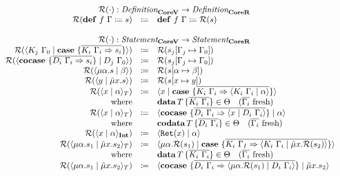 \[
  \begin{array}{rcll}
    \multicolumn{4}{c}{\redundancy{\cdot} : \emph{Definition}_{\targetvar{}} \rightarrow \emph{Definition}_{\targetred{}}}\\
    \redundancy{\defi{f\ \Gamma}{s}} & \coloneq & \defi{f\ \Gamma}{\redundancy{s}} & \\
    \\
    \multicolumn{4}{c}{\redundancy{\cdot} : \emph{Statement}_{\targetvar{}} \rightarrow \emph{Statement}_{\targetred{}}}\\
    \redundancy{\cut{K_j\ \Gamma_0}{\case{\overline{K_i\ \Gamma_i \Rightarrow s_i}}}} & \coloneq & \redundancy{s_j[\Gamma_j \mapsto \Gamma_0]} & \\
    \redundancy{\cut{\cocase{\overline{D_i\ \Gamma_i \Rightarrow s_i}}}{D_j\ \Gamma_0}} & \coloneq & \redundancy{s_j[\Gamma_j \mapsto \Gamma_0]} & \\
    \redundancy{\cut{\mu\alpha.s}{\beta}} & \coloneq & \redundancy{s[\alpha \mapsto \beta]} & \\
    \redundancy{\cut{y}{\tilde{\mu}x.s}} & \coloneq & \redundancy{s[x \mapsto y]} & \\
    \redundancy{\cut{x}{\alpha}_T} & \coloneq & \cut{x}{\case{\overline{K_i\ \Gamma_i \Rightarrow \cut{K_i\ \Gamma_i}{\alpha}}}} & \\
    \text{where} &  & \data{T}{\overline{K_i\ \Gamma_i}} \in \Theta \quad \fresh{\overline{\Gamma_i}} & \\
    \redundancy{\cut{x}{\alpha}_T} & \coloneq & \cut{\cocase{\overline{D_i\ \Gamma_i \Rightarrow \cut{x}{D_i\ \Gamma_i}}}}{\alpha} & \\
    \text{where} &  & \codata{T}{\overline{D_i\ \Gamma_i}} \in \Theta \quad \fresh{\overline{\Gamma_i}} & \\
    \redundancy{\cut{x}{\alpha}_\tyint} & \coloneq & \cut{\mathtt{Ret}(x)}{\alpha} & \\
    \redundancy{\cut{\mu\alpha.s_1}{\tilde{\mu}x.s_2}_T} & \coloneq & \cut{\mu\alpha.\redundancy{s_1}}{\case{\overline{K_i\ \Gamma_I \Rightarrow \cut{K_i\ \Gamma_i}{\tilde{\mu}x.\redundancy{s_2}}}}} & \\
    \text{where} &  & \data{T}{\overline{K_i\ \Gamma_i}} \in \Theta \quad \fresh{\overline{\Gamma_i}} & \\
    \redundancy{\cut{\mu\alpha.s_1}{\tilde{\mu}x.s_2}_T} & \coloneq & \cut{\cocase{\overline{D_i\ \Gamma_i \Rightarrow \cut{\mu\alpha.\redundancy{s_1}}{D_i\ \Gamma_i}}}}{\tilde{\mu}x.s_2} & \\

\end{array}\]
